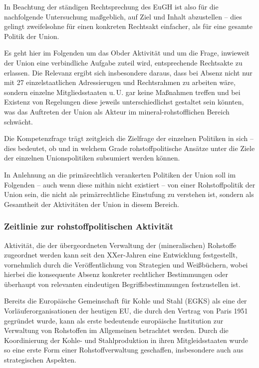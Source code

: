\documentclass[12pt,a4paper,oneside]{book} %
\begin{document}
In Beachtung der ständigen Rechtsprechung des EuGH ist also für die nachfolgende Untersuchung maßgeblich, auf Ziel und Inhalt abzustellen -- dies gelingt zweifelsohne für einen konkreten Rechtsakt einfacher, als für eine gesamte Politik der Union.
	
Es geht hier im Folgenden um das \glqq Ob\grqq der Aktivität und um die Frage, inwieweit der Union eine verbindliche Aufgabe zuteil wird, entsprechende Rechtsakte zu erlassen. Die Relevanz ergibt sich insbesondere daraus, dass bei Absenz nicht nur mit 27 einzelstaatlichen Adressierugen und Rechtsrahmen zu arbeiten wäre, sondern einzelne Mitgliedsstaaten u.\,U. gar keine Maßnahmen treffen und bei Existenz von Regelungen diese jeweils unterschiedlichst gestaltet sein könnten, was das Auftreten der Union als Akteur im mineral-rohstofflichen Bereich schwächt.

Die Kompetenzfrage trägt zeitgleich die Zielfrage der einzelnen Politiken in sich -- dies bedeutet, ob und in welchem Grade rohstoffpolitische Ansätze unter die Ziele der einzelnen Unionspolitiken subsumiert werden können.

In Anlehnung an die primärechtlich verankerten Politiken der Union soll im Folgenden -- auch wenn diese mithin nicht existiert -- von einer Rohstoffpolitik der Union sein, die nicht als primärrechtliche Einstufung zu verstehen ist, sondern als Gesamtheit der Aktivitäten der Union in diesem Bereich.
	
\subsubsection{Zeitlinie zur rohstoffpolitischen Aktivität}
	
Aktivität, die der übergeordneten Verwaltung der (mineralischen) Rohstoffe zugeordnet werden kann seit den XXer-Jahren eine Entwicklung festgestellt, vornehmlich durch die Veröffentlichung von Strategien und Weißbüchern, wobei hierbei die konsequente Absenz konkreter rechtlicher Bestimmungen oder überhaupt von relevanten eindeutigen Begriffsbestimmungen festzustellen ist.
	
Bereits die Europäische Gemeinschaft für Kohle und Stahl (EGKS) als eine der Vorläuferorganisationen der heutigen EU, die durch den Vertrag von Paris 1951 gegründet wurde, kann als erste bedeutende europäische Institution zur Verwaltung von Rohstoffen im Allgemeinen betrachtet werden. Durch die Koordinierung der Kohle- und Stahlproduktion in ihren Mitgleidsstaaten wurde so eine erste Form einer Rohstoffverwaltung geschaffen, insbesondere auch aus strategischen Aspekten.%
	
\end{document}
